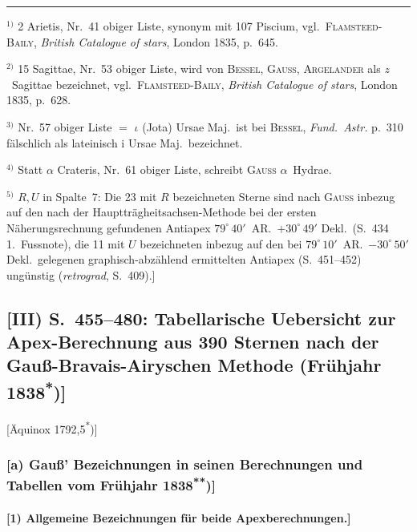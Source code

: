 \documentclass[12pt,a4paper]{article}
\theoremstyle{plain}
\theoremstyle{definition}
\theoremstyle{remark}
\begin{document}
\medskip
\noindent\rule{\textwidth}{0.4pt}
\begin{footnotesize}
$^{1)}$ 2 Arietis, Nr.~41 obiger Liste, synonym mit 107 Piscium, vgl.~\textsc{Flamsteed-Baily},
\textit{British Catalogue of stars}, London 1835, p.~645.

$^{2)}$ 15 Sagittae, Nr.~53 obiger Liste, wird von \textsc{Bessel}, \textsc{Gau\ss}, \textsc{Argelander}
als $z$~Sagittae bezeichnet, vgl.~\textsc{Flamsteed-Baily}, \textit{British Catalogue of stars},
London 1835, p.~628.

$^{3)}$ Nr.~57 obiger Liste $=$ $\iota$ (Jota) Ursae Maj.~ist bei \textsc{Bessel}, \textit{Fund.~Astr.}
p.~310 f\"alschlich als lateinisch i Ursae Maj.~bezeichnet.

$^{4)}$ Statt $\alpha$ Crateris, Nr.~61 obiger Liste, schreibt \textsc{Gau\ss} $\alpha$~Hydrae.

$^{5)}$ $R, U$ in Spalte~7: Die 23 mit $R$ bezeichneten Sterne sind nach \textsc{Gau\ss} inbezug
auf den nach der Haupttr\"agheitsachsen-Methode bei der ersten N\"aherungsrechnung gefundenen
Antiapex $79^{\circ}\,40'$~AR.~$+30^{\circ}\,49'$ Dekl.~(S.~434 1.~Fussnote), die 11 mit $U$
bezeichneten inbezug auf den bei $79^{\circ}\,10'$~AR.~$-30^{\circ}\,50'$ Dekl.~gelegenen
graphisch-abz\"ahlend ermittelten Antiapex (S.~451--452) ung\"unstig (\textit{\glqq retrograd\grqq}, S.~409).]
\end{footnotesize}


\newpage
\subsection*{[III) S.~455--480: Tabellarische Uebersicht zur Apex-Berechnung aus 390 Sternen nach der Gau\ss-Bravais-Airyschen Methode (Fr\"uhjahr 1838\textsuperscript{*})]}

\begin{center}
[\"Aquinox 1792,5\textsuperscript{*})]
\end{center}

\subsubsection*{[a) Gau\ss' Bezeichnungen in seinen Berechnungen und Tabellen vom Fr\"uhjahr 1838\textsuperscript{**})]}

\paragraph*{[1) Allgemeine Bezeichnungen f\"ur beide Apexberechnungen.]}
\end{document}
